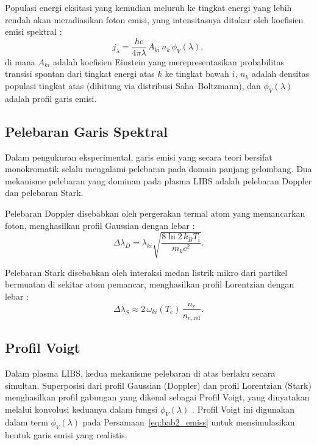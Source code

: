 Populasi energi eksitasi yang kemudian meluruh ke tingkat energi yang lebih rendah akan meradiasikan foton emisi, yang intensitasnya ditakar oleh koefisien emisi spektral \citep{fujimoto_plasma_2004}:
\begin{equation} \label{eq:bab2_emiss}
j_\lambda = \frac{hc}{4\pi\lambda}\,A_{ki}\,n_k\,\phi_V(\lambda),
\end{equation}
di mana $A_{ki}$ adalah koefisien Einstein yang merepresentasikan probabilitas transisi spontan dari tingkat energi atas $k$ ke tingkat bawah $i$, $n_k$ adalah densitas populasi tingkat atas (dihitung via distribusi Saha--Boltzmann), dan $\phi_V(\lambda)$ adalah profil garis emisi.

\subsection{Pelebaran Garis Spektral}

Dalam pengukuran eksperimental, garis emisi yang secara teori bersifat monokromatik selalu mengalami pelebaran pada domain panjang gelombang. Dua mekanisme pelebaran yang dominan pada plasma LIBS adalah pelebaran Doppler dan pelebaran Stark.

Pelebaran Doppler disebabkan oleh pergerakan termal atom yang memancarkan foton, menghasilkan profil Gaussian dengan lebar \citep{griem_spectral_1974}:
\begin{equation} \label{eq:bab2_doppler}
\Delta\lambda_D = \lambda_{ki}\sqrt{\frac{8\ln 2\,k_B T_i}{m_k c^2}}.
\end{equation}

Pelebaran Stark disebabkan oleh interaksi medan listrik mikro dari partikel bermuatan di sekitar atom pemancar, menghasilkan profil Lorentzian dengan lebar \citep{griem_spectral_1974}:
\begin{equation} \label{eq:bab2_stark}
\Delta\lambda_S \approx 2\,\omega_{ki}(T_e)\,\frac{n_e}{n_{e,\mathrm{ref}}}.
\end{equation}

\subsection{Profil Voigt}

Dalam plasma LIBS, kedua mekanisme pelebaran di atas berlaku secara simultan. Superposisi dari profil Gaussian (Doppler) dan profil Lorentzian (Stark) menghasilkan profil gabungan yang dikenal sebagai Profil Voigt, yang dinyatakan melalui konvolusi keduanya dalam fungsi $\phi_V(\lambda)$ \citep{griem_spectral_1974}. Profil Voigt ini digunakan dalam term $\phi_V(\lambda)$ pada Persamaan~\ref{eq:bab2_emiss} untuk mensimulasikan bentuk garis emisi yang realistis.

